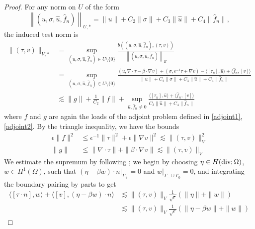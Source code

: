 \documentclass[11pt,onecolumn]{scrartcl}
\newcommand{\grad}{\nabla}
\renewcommand{\div}{\grad \cdot}
\begin{document}
\begin{proof}
For any norm on $U$ of the form
\[
\left\|\left(u,\sigma,\widehat{u},\widehat{f}_n\right)\right\|_{U,*} = \|u\| + C_2 \|\sigma\| + C_3 \|\widehat{u}\| + C_4 \|\widehat{f}_n\|,
\]
the induced test norm is  
\begin{align*}
\| \left(\tau,v\right) \|_{V,*} &= \sup_{\left(u,\sigma,\widehat{u},\widehat{f}_n\right) \in U\setminus \{0\}} \frac{b\left(\left(u,\sigma,\widehat{u},\widehat{f}_n\right),\left(\tau,v\right)\right)}{\left\|\left(u,\sigma,\widehat{u},\widehat{f}_n\right)\right\|_E} \\
& = \sup_{\left(u,\sigma,\widehat{u},\widehat{f}_n\right) \in U\setminus \{0\}} \frac{\left(u,\div \tau - \beta \cdot \grad v\right) + \left(\sigma, \epsilon^{-1} \tau + \grad v\right) - \langle \left[\tau_n\right], \widehat{u} \rangle + \langle \widehat{f}_n, \left[v\right] \rangle
}{\|u\| + C_2 \|\sigma\| + C_3 \|\widehat{u}\| + C_4 \|\widehat{f}_n\|} \\
&\lesssim \|g\| + \frac{1}{C_2}\|f\| + \sup_{\widehat{u},\widehat{f}_n \neq 0}\frac{\langle \left[\tau_n\right], \widehat{u} \rangle + \langle \widehat{f}_n, \left[v\right] \rangle}{C_3\|\widehat{u}\| + C_4\|\widehat{f}_n\|}
\end{align*}
where $f$ and $g$ are again the loads of the adjoint problem defined in \eqref{adjoint1}, \eqref{adjoint2}.  By the triangle inequality, we have the bounds
\begin{align*}
\epsilon \|f \|^2 &\leq \epsilon^{-1} \| \tau\|^2 + {\epsilon} \|\grad v\|^2 \lesssim \| \left(\tau,v\right)\|_V^2\\
\|g \| &\leq \|\div \tau\| +  \|\beta \cdot \grad v\| \lesssim \| \left(\tau,v\right)\|_V
\end{align*}
We estimate the supremum by following \cite{DPGrobustness}; we begin by choosing $\eta \in H({\rm div}; \Omega)$, $w\in H^1(\Omega)$, such that $\left.\left(\eta-\beta w \right)\cdot n\right |_{\Gamma_+} = 0$ and $\left.w\right |_{\Gamma_-\cup\Gamma_0} = 0$, and integrating the boundary pairing by parts to get
\begin{align*}
\langle [\tau\cdot n],w\rangle + \langle [v],\left(\eta - \beta w\right)\cdot n\rangle &\lesssim \|\left(\tau,v\right)\|_V\frac{1}{\sqrt{\epsilon}}\left(\|\eta\| + \|w\|\right)\\
&\lesssim \|\left(\tau,v\right)\|_V\frac{1}{\sqrt{\epsilon}}\left(\|\eta-\beta w\| + \|w\|\right)
\end{align*}

\end{proof}
\end{document}
